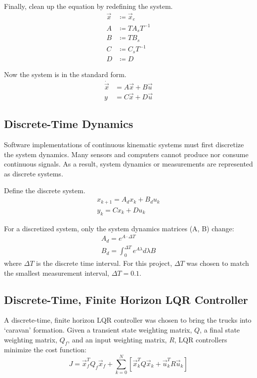 \documentclass[12pt,onecolumn,reqno]{amsart}
\begin{document}
Finally, clean up the equation by redefining the system.
\begin{align*}
  \vec{x} &\coloneqq \vec{x}_{e}    \\
  A       &\coloneqq T A_{s} T^{-1} \\
  B       &\coloneqq T B_{s}        \\
  C       &\coloneqq C_{s} T^{-1}   \\
  D       &\coloneqq D
\end{align*}

Now the system is in the standard form.
\begin{align*}
  \dot{\vec{x}} &= A \vec{x} + B \vec{u} \\
  y &= C \vec{x} + D \vec{u}
\end{align*}


\subsection{Discrete-Time Dynamics}
Software implementations of continuous kinematic systems must first discretize
the system dynamics. Many sensors and computers cannot produce nor consume
continuous signals. As a result, system dynamics or measurements are
represented as discrete systems. 

Define the discrete system. 
\begin{align*}
  x_{k+1} = A_{d} x_{k} + B_{d} u_k \\
  y_{k} = C x_{k} + D u_{k}
\end{align*}

For a discretized system, only the system dynamics matrices (A, B) change:
\begin{align*}
  A_{d} = e^{A \cdot \Delta T} \\
  B_d = \int_{0}^{\Delta T} e^{A \lambda} d \lambda B
\end{align*}
where $\Delta T$ is the discrete time interval. For this project, $\Delta T$ was
chosen to match the smallest measurement interval, $\Delta T = 0.1$.


\subsection{Discrete-Time, Finite Horizon LQR Controller}
A discrete-time, finite horizon LQR controller was chosen to bring the trucks
into `caravan' formation. Given a transient state weighting matrix, $Q$, a final
state weighting matrix, $Q_{f}$, and an input weighting matrix, $R$, LQR
controllers minimize the cost function:
\begin{equation*}
  J = \vec{x}_{f}^{T} Q_{f} \vec{x}_{f} + \sum_{k=0}^{N} \left[ \vec{x}_{k}^{T} Q
  \vec{x}_{k} + \vec{u}_{k}^{T} R \vec{u}_{k} \right]
\end{equation*}
\end{document}
